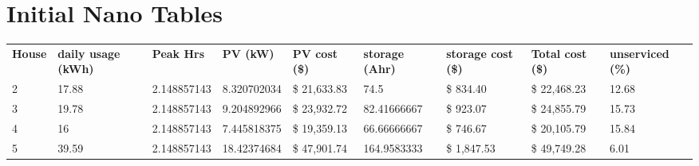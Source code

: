 \documentclass[journal]{IEEEtran}
\begin{document}
        \section{Initial Nano Tables}
        \begin{table}[h!]
                \begin{tabular}{|l|l|l|l|l|l|l|l|l|}
                \hline
                \rowcolor[HTML]{C0C0C0} 
                \multicolumn{9}{|c|}{\cellcolor[HTML]{C0C0C0}\textit{\textbf{Initial   Solar}}}                                                                                                                                          \\ \hline
                \textbf{House} & \textbf{daily usage (kWh)} & \textbf{Peak Hrs} & \textbf{PV (kW)} & \textbf{PV cost (\$)}   & \textbf{storage (Ahr)} & \textbf{storage cost (\$)} & \textbf{Total cost (\$)} & \textbf{unserviced (\%)} \\ \hline
                \rowcolor[HTML]{9AFF99} 
                2              & 17.88                      & 2.148857143       & 8.320702034      & \$            21,633.83 & 74.5                   & \$             834.40      & \$    22,468.23          & 12.68                    \\ \hline
                \rowcolor[HTML]{FFFFC7} 
                3              & 19.78                      & 2.148857143       & 9.204892966      & \$            23,932.72 & 82.41666667            & \$             923.07      & \$    24,855.79          & 15.73                    \\ \hline
                \rowcolor[HTML]{FFCCC9} 
                4              & 16                         & 2.148857143       & 7.445818375      & \$            19,359.13 & 66.66666667            & \$             746.67      & \$    20,105.79          & 15.84                    \\ \hline
                \rowcolor[HTML]{CBCEFB} 
                5              & 39.59                      & 2.148857143       & 18.42374684      & \$            47,901.74 & 164.9583333            & \$          1,847.53       & \$    49,749.28          & 6.01                     \\ \hline
                \end{tabular}
        \end{table}
                
\end{document}

